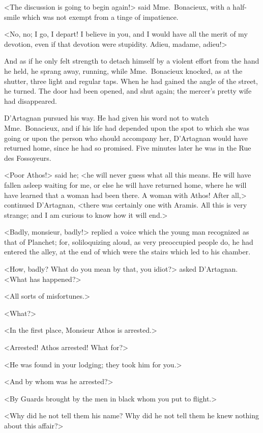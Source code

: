 <The discussion is going to begin again!> said Mme.~Bonacieux, with a half-smile which was not exempt from a tinge of impatience. 

<No, no; I go, I depart! I believe in you, and I would have all the merit of my devotion, even if that devotion were stupidity. Adieu, madame, adieu!> 

And as if he only felt strength to detach himself by a violent effort from the hand he held, he sprang away, running, while Mme.~Bonacieux knocked, as at the shutter, three light and regular taps. When he had gained the angle of the street, he turned. The door had been opened, and shut again; the mercer's pretty wife had disappeared. 

D'Artagnan pursued his way. He had given his word not to watch Mme.~Bonacieux, and if his life had depended upon the spot to which she was going or upon the person who should accompany her, D'Artagnan would have returned home, since he had so promised. Five minutes later he was in the Rue des Fossoyeurs. 

<Poor Athos!> said he; <he will never guess what all this means. He will have fallen asleep waiting for me, or else he will have returned home, where he will have learned that a woman had been there. A woman with Athos! After all,> continued D'Artagnan, <there was certainly one with Aramis. All this is very strange; and I am curious to know how it will end.> 

<Badly, monsieur, badly!> replied a voice which the young man recognized as that of Planchet; for, soliloquizing aloud, as very preoccupied people do, he had entered the alley, at the end of which were the stairs which led to his chamber. 

<How, badly? What do you mean by that, you idiot?> asked D'Artagnan. <What has happened?> 

<All sorts of misfortunes.> 

<What?> 

<In the first place, Monsieur Athos is arrested.> 

<Arrested! Athos arrested! What for?> 

<He was found in your lodging; they took him for you.> 

<And by whom was he arrested?> 

<By Guards brought by the men in black whom you put to flight.> 

<Why did he not tell them his name? Why did he not tell them he knew nothing about this affair?> 

